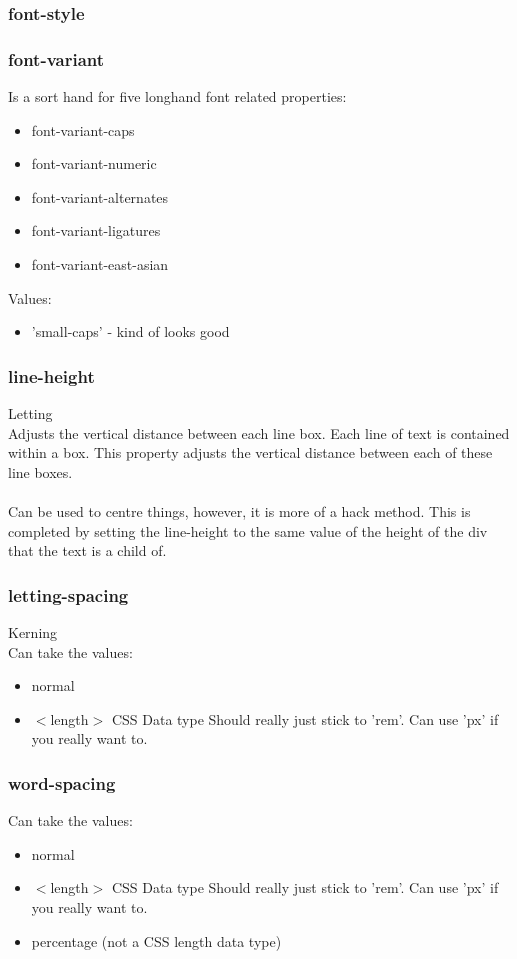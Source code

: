\documentclass[]{article}
\begin{document}
\subsubsection{font-style}

\subsubsection{font-variant}
Is a sort hand for five longhand font related properties:
\begin{itemize}
	\item font-variant-caps
	\item font-variant-numeric
	\item font-variant-alternates
	\item font-variant-ligatures
	\item font-variant-east-asian
\end{itemize}
Values:
\begin{itemize}
	\item 'small-caps' - kind of looks good
\end{itemize}

\subsubsection{line-height}
Letting
\\
Adjusts the vertical distance between each line box.  Each line of text is contained within a box.  This property adjusts the vertical distance between each of these line boxes.
\\\\
Can be used to centre things, however, it is more of a hack method.  This is completed by setting the line-height to the same value of the height of the div that the text is a child of.

\subsubsection{letting-spacing}
Kerning
\\
Can take the values:
\begin{itemize}
	\item normal
	
	\item $<$length$>$  CSS Data type 
	\subitem Should really just stick to 'rem'.  Can use 'px' if you really want to.
\end{itemize}

\subsubsection{word-spacing}
Can take the values:
\begin{itemize}
	\item normal
	
	\item $<$length$>$  CSS Data type 
	\subitem Should really just stick to 'rem'.  Can use 'px' if you really want to.
	
	\item percentage (not a CSS length data type)
\end{itemize}
\end{document}
